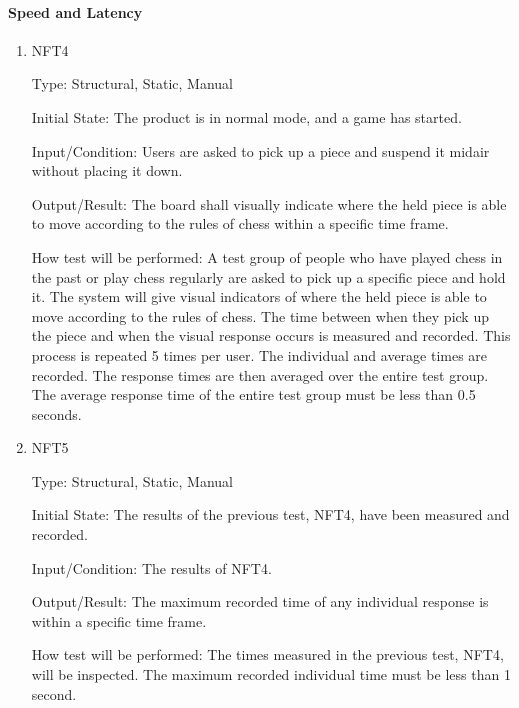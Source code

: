 \documentclass[12pt, titlepage]{article}
\begin{document}
\paragraph{Speed and Latency}
\begin{enumerate}
    \item{NFT4}

        Type: Structural, Static, Manual
                            
        Initial State: The product is in normal mode, and a game has started.
                            
        Input/Condition: Users are asked to pick up a piece and suspend it midair without placing it down.
                            
        Output/Result: The board shall visually indicate where the held piece is able to move according to the rules of chess within a specific time frame.
                            
        How test will be performed: A test group of people who have played chess in the past or play chess regularly are asked to pick up a specific piece and 
            hold it. The system will give visual indicators of where the held piece is able to move according to the rules of chess. The time between when 
            they pick up the piece and when the visual response occurs is measured and recorded. This process is repeated 5 times per user. The individual and average
            times are recorded. The response times are then averaged over the entire test group. The average response time of the entire test group must be less than 
            0.5 seconds.
                        
    \item{NFT5}

        Type: Structural, Static, Manual
                            
        Initial State: The results of the previous test, NFT4, have been measured and recorded.
                            
        Input/Condition: The results of NFT4.
                            
        Output/Result: The maximum recorded time of any individual response is within a specific time frame.
                            
        How test will be performed: The times measured in the previous test, NFT4, will be inspected. The maximum recorded individual time must be less than 
            1 second.


\end{enumerate}
\end{document}

